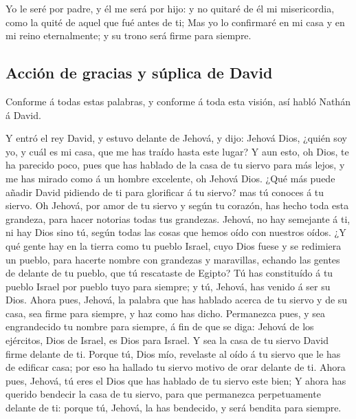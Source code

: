 Yo le seré por padre, y él me será por hijo: y no quitaré
de él mi misericordia, como la quité de aquel que fué antes de ti;
 Mas yo lo confirmaré en mi casa y en mi reino
eternalmente; y su trono será firme para siempre.

\hypertarget{acciuxf3n-de-gracias-y-suxfaplica-de-david}{%
\subsection{Acción de gracias y súplica de
David}\label{acciuxf3n-de-gracias-y-suxfaplica-de-david}}

 Conforme á todas estas palabras, y conforme á toda esta
visión, así habló Nathán á David.

 Y entró el rey David, y estuvo delante de Jehová, y dijo:
Jehová Dios, ¿quién soy yo, y cuál es mi casa, que me has traído hasta
este lugar?  Y aun esto, oh Dios, te ha parecido poco, pues
que has hablado de la casa de tu siervo para más lejos, y me has mirado
como á un hombre excelente, oh Jehová Dios.  ¿Qué más puede
añadir David pidiendo de ti para glorificar á tu siervo? mas tú conoces
á tu siervo.  Oh Jehová, por amor de tu siervo y según tu
corazón, has hecho toda esta grandeza, para hacer notorias todas tus
grandezas.  Jehová, no hay semejante á ti, ni hay Dios sino
tú, según todas las cosas que hemos oído con nuestros oídos.
 ¿Y qué gente hay en la tierra como tu pueblo Israel, cuyo
Dios fuese y se redimiera un pueblo, para hacerte nombre con grandezas y
maravillas, echando las gentes de delante de tu pueblo, que tú
rescataste de Egipto?  Tú has constituído á tu pueblo
Israel por pueblo tuyo para siempre; y tú, Jehová, has venido á ser su
Dios.  Ahora pues, Jehová, la palabra que has hablado
acerca de tu siervo y de su casa, sea firme para siempre, y haz como has
dicho.  Permanezca pues, y sea engrandecido tu nombre para
siempre, á fin de que se diga: Jehová de los ejércitos, Dios de Israel,
es Dios para Israel. Y sea la casa de tu siervo David firme delante de
ti.  Porque tú, Dios mío, revelaste al oído á tu siervo que
le has de edificar casa; por eso ha hallado tu siervo motivo de orar
delante de ti.  Ahora pues, Jehová, tú eres el Dios que has
hablado de tu siervo este bien;  Y ahora has querido
bendecir la casa de tu siervo, para que permanezca perpetuamente delante
de ti: porque tú, Jehová, la has bendecido, y será bendita para siempre.

